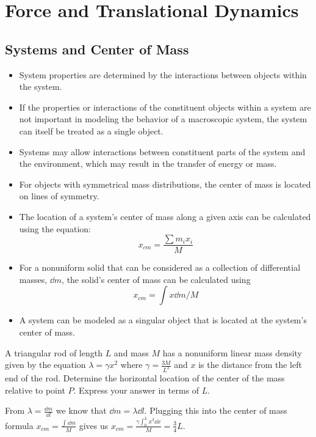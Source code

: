 \documentclass[../mech.tex]{subfiles}
\begin{document}
\chapter{Force and Translational Dynamics}
\section{Systems and Center of Mass}
\begin{itemize}
    \item System properties are determined by the interactions between objects within the system.
    \item If the properties or interactions of the constituent objects within a system are not important in modeling the behavior of a macroscopic system, the system can itself be treated as a single object.
    \item Systems may allow interactions between constituent parts of the system and the environment, which may result in the transfer of energy or mass.
    \item For objects with symmetrical mass distributions, the center of mass is located on lines of symmetry.
    \item The location of a system's center of mass along a given axis can be calculated using the equation:
    \[ x_{cm}=\frac{\sum m_ix_i}{M}\] 
    \item For a nonuniform solid that can be considered as a collection of differential masses, $\dd m$, the solid's center of mass can be calculated using 
    \[ x_{cm}=\int x\dd m/M \]
    \item A system can be modeled as a singular object that is located at the system's center of mass.
\end{itemize}

\begin{example}
    A triangular rod of length $L$ and mass $M$ has a nonuniform linear mass density given by the equation $\lambda = \gamma x^2$ where $\gamma = \frac{3M}{L^2}$ and $x$ is the distance 
    from the left end of the rod. Determine the horizontal location of the center of the mass relative to point $P$. Express your answer in terms of $L$.

    From $\lambda =\frac{\dd m}{\dd l}$ we know that $\dd m = \lambda \dd l$. Plugging this into the center of mass formula $x_{cm}=\frac{\int \dd m}{M}$ gives us 
    $x_{cm}=\frac{\gamma \int_0^L x^3 \dd x}{M} = \frac{3}{4}L$.
\end{example}
\end{document}
